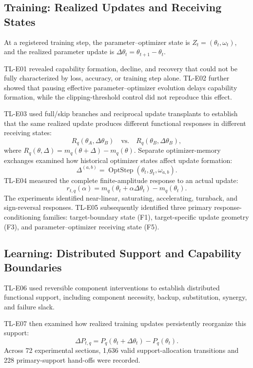 \documentclass[10pt,twocolumn,letterpaper]{article}
\begin{document}
\subsection{Training: Realized Updates and Receiving States}
At a registered training step, the parameter--optimizer state is $Z_t=(\theta_t,\omega_t)$, and the realized parameter update is $\Delta\theta_t=\theta_{t+1}-\theta_t$.

TL-E01 revealed capability formation, decline, and recovery that could not be fully characterized by loss, accuracy, or training step alone. TL-E02 further showed that pausing effective parameter--optimizer evolution delays capability formation, while the clipping-threshold control did not reproduce this effect.

TL-E03 used full/skip branches and reciprocal update transplants to establish that the same realized update produces different functional responses in different receiving states:
\begin{equation}
 R_q(\theta_A,\Delta\theta_B)\quad\text{vs.}\quad R_q(\theta_B,\Delta\theta_B),
 \label{eq:receiver}
\end{equation}
where $R_q(\theta,\Delta)=m_q(\theta+\Delta)-m_q(\theta)$. Separate optimizer-memory exchanges examined how historical optimizer states affect update formation:
\begin{equation}
 \Delta^{(a,b)}=\operatorname{OptStep}(\theta_t,g_t,\omega_{a,b}).
 \label{eq:optmem}
\end{equation}
TL-E04 measured the complete finite-amplitude response to an actual update:
\begin{equation}
 r_{t,q}(\alpha)=m_q(\theta_t+\alpha\Delta\theta_t)-m_q(\theta_t).
 \label{eq:response}
\end{equation}
The experiments identified near-linear, saturating, accelerating, turnback, and sign-reversal responses. TL-E05 subsequently identified three primary response-conditioning families: target-boundary state (F1), target-specific update geometry (F3), and parameter--optimizer receiving state (F5).

\subsection{Learning: Distributed Support and Capability Boundaries}
TL-E06 used reversible component interventions to establish distributed functional support, including component necessity, backup, substitution, synergy, and failure slack.

TL-E07 then examined how realized training updates persistently reorganize this support:
\begin{equation}
 \Delta P_{t,q}=P_q(\theta_t+\Delta\theta_t)-P_q(\theta_t).
 \label{eq:realloc}
\end{equation}
Across 72 experimental sections, 1,636 valid support-allocation transitions and 228 primary-support hand-offs were recorded.
\end{document}
